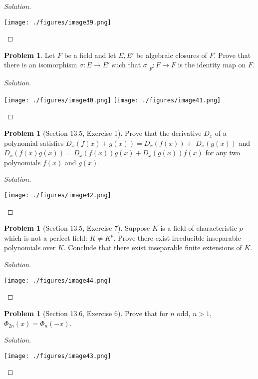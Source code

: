 \documentclass{amsart}
\numberwithin{equation}{section}
\theoremstyle{definition}
\newtheorem{problem}[thm]{Problem}
\begin{document}
\begin{proof}[Solution]\
\begin{center}
  \texttt{[image: ./figures/image39.png]}
\end{center}
\end{proof}




\begin{problem}
  Let \( F \) be a field and let \( E,E' \) be algebraic closures of
  \( F \). Prove that there is an isomorphism \( \sigma:E\to E' \)
  such that \( \sigma|_F:F\to F \) is the identity map on \( F \).
\end{problem}

\begin{proof}[Solution]\
\begin{center}
  \texttt{[image: ./figures/image40.png]}
  \texttt{[image: ./figures/image41.png]}
\end{center}
\end{proof}



\begin{problem}[Section 13.5, Exercise 1]
  Prove that the derivative \(D_x\) of a polynomial satisfies \(D_x(f(x)+g(x))=D_x(f(x))+\) \(D_x(g(x))\) and \(D_x(f(x) g(x))=D_x(f(x)) g(x)+D_x(g(x)) f(x)\) for any two polynomials \(f(x)\) and \(g(x)\).
\end{problem}

\begin{proof}[Solution]\
\begin{center}
  \texttt{[image: ./figures/image42.png]}
\end{center}
\end{proof}



\begin{problem}[Section 13.5, Exercise 7]
Suppose \(K\) is a field of characteristic \(p\) which is not a perfect field: \(K \neq K^p\). Prove there exist irreducible inseparable polynomials over \(K\). Conclude that there exist inseparable finite extensions of \(K\).
\end{problem}

\begin{proof}[Solution]\
\begin{center}
  \texttt{[image: ./figures/image44.png]}
\end{center}
\end{proof}



\begin{problem}[Section 13.6, Exercise 6]
  Prove that for \( n \) odd, \( n>1 \),
  \( \Phi_{2 n}(x)=\Phi_n(-x) \).
\end{problem}

\begin{proof}[Solution]\
\begin{center}
  \texttt{[image: ./figures/image43.png]}
\end{center}
\end{proof}
\end{document}
